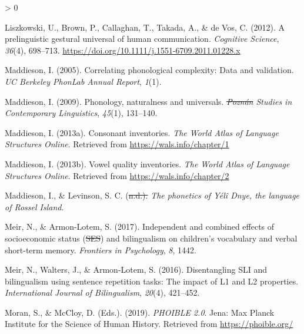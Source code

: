 \documentclass[ %
american, %
,man,floatsintext]{apa6} %
\newlength{\cslhangindent} %
\newenvironment{CSLReferences}[2] %
{%
	\setlength{\parindent}{0pt} %
	\ifodd #1 \everypar{\setlength{\hangindent}{\cslhangindent}}\ignorespaces\fi %
	\ifnum #2 > 0 %
	\setlength{\parskip}{#2\baselineskip} %
	\fi %
}%
{} %
\providecommand{\DIFaddtex}[1]{{\protect\color{blue}\uwave{#1}}} %
\providecommand{\DIFdeltex}[1]{{\protect\color{red}\sout{#1}}}                      %
\providecommand{\DIFaddbegin}{} %
\providecommand{\DIFaddend}{} %
\providecommand{\DIFdelbegin}{} %
\providecommand{\DIFdelend}{} %
\providecommand{\DIFadd}[1]{\texorpdfstring{\DIFaddtex{#1}}{#1}} %
\providecommand{\DIFdel}[1]{\texorpdfstring{\DIFdeltex{#1}}{}} %
\newcommand{\DIFscaledelfig}{0.5}
\newlength{\DIFdelgraphicswidth} %
\newlength{\DIFdelgraphicsheight} %
\newcommand{\DIFaddincludegraphics}[2][]{{\color{blue}\fbox{\DIFOincludegraphics[#1]{#2}}}} %
\newcommand{\DIFdelincludegraphics}[2][]{%
	\sbox{\DIFdelgraphicsbox}{\DIFOincludegraphics[#1]{#2}}%
	\settoboxwidth{\DIFdelgraphicswidth}{\DIFdelgraphicsbox} %
	\settoboxtotalheight{\DIFdelgraphicsheight}{\DIFdelgraphicsbox} %
	\scalebox{\DIFscaledelfig}{%
		\parbox[b]{\DIFdelgraphicswidth}{\usebox{\DIFdelgraphicsbox}\\[-\baselineskip] \rule{\DIFdelgraphicswidth}{0em}}\llap{\resizebox{\DIFdelgraphicswidth}{\DIFdelgraphicsheight}{%
				\setlength{\unitlength}{\DIFdelgraphicswidth}%
				\begin{picture}(1,1)%
				\thicklines\linethickness{2pt} %
				{\color[rgb]{1,0,0}\put(0,0){\framebox(1,1){}}}%
				{\color[rgb]{1,0,0}\put(0,0){\line( 1,1){1}}}%
				{\color[rgb]{1,0,0}\put(0,1){\line(1,-1){1}}}%
				\end{picture}%
			}\hspace*{3pt}}} %
} %
\DeclareRobustCommand{\DIFaddbegin}{\DIFOaddbegin \let\includegraphics\DIFaddincludegraphics} %
\DeclareRobustCommand{\DIFaddend}{\DIFOaddend \let\includegraphics\DIFOincludegraphics} %
\DeclareRobustCommand{\DIFdelbegin}{\DIFOdelbegin \let\includegraphics\DIFdelincludegraphics} %
\DeclareRobustCommand{\DIFdelend}{\DIFOaddend \let\includegraphics\DIFOincludegraphics} %
\begin{document}
\begin{CSLReferences}{1}{0}
	\leavevmode\hypertarget{ref-liszkowski2012prelinguistic}{}%
	Liszkowski, U., Brown, P., Callaghan, T., Takada, A., \& de Vos, C. (2012). A prelinguistic gestural universal of human communication. \emph{Cognitive Science}, \emph{36}(4), 698--713. \url{https://doi.org/10.1111/j.1551-6709.2011.01228.x}
	
	\leavevmode\hypertarget{ref-maddieson2005correlating}{}%
	Maddieson, I. (2005). Correlating phonological complexity: Data and validation. \emph{UC Berkeley PhonLab Annual Report}, \emph{1}(1).
	
	\leavevmode\hypertarget{ref-maddieson2009phonology}{}%
	Maddieson, I. (2009). Phonology, naturalness and universals. \emph{\DIFdelbegin \DIFdel{Poznán }\DIFdelend \DIFaddbegin \DIFadd{Pozn}{\DIFadd{á}}\DIFadd{n }\DIFaddend Studies in Contemporary Linguistics}, \emph{45}(1), 131--140.
	
	\leavevmode\hypertarget{ref-maddieson2013consonant}{}%
	Maddieson, I. (2013a). Consonant inventories. \emph{The World Atlas of Language Structures Online}. Retrieved from \url{https://wals.info/chapter/1}
	
	\leavevmode\hypertarget{ref-maddieson2013vowel}{}%
	Maddieson, I. (2013b). Vowel quality inventories. \emph{The World Atlas of Language Structures Online}. Retrieved from \url{https://wals.info/chapter/2}
	
	\leavevmode\hypertarget{ref-maddiesonIPphoneticsYD}{}%
	Maddieson, I., \& Levinson, S. C. (\DIFdelbegin \DIFdel{n.d.). }\DIFdelend \DIFaddbegin \DIFadd{in preparation). }\DIFaddend \emph{The phonetics of \DIFaddbegin {\DIFaddend Yélî Dnye\DIFaddbegin }\DIFaddend , the language of \DIFaddbegin {\DIFaddend Rossel Island\DIFaddbegin }\DIFaddend }.
	
	\leavevmode\hypertarget{ref-meir2017independent}{}%
	Meir, N., \& Armon-Lotem, S. (2017). Independent and combined effects of socioeconomic status (\DIFdelbegin \DIFdel{SES}\DIFdelend \DIFaddbegin {\DIFadd{SES}}\DIFaddend ) and bilingualism on children's vocabulary and verbal short-term memory. \emph{Frontiers in Psychology}, \emph{8}, 1442.
	
	\leavevmode\hypertarget{ref-meir2016disentangling}{}%
	Meir, N., Walters, J., \& Armon-Lotem, S. (2016). \DIFaddbegin {\DIFaddend Disentangling SLI and bilingualism using sentence repetition tasks: The impact of L1 and L2 properties\DIFaddbegin }\DIFaddend . \emph{International Journal of Bilingualism}, \emph{20}(4), 421--452.
	
	\leavevmode\hypertarget{ref-phoible}{}%
	Moran, S., \& McCloy, D. (Eds.). (2019). \emph{PHOIBLE 2.0}. Jena: Max Planck Institute for the Science of Human History. Retrieved from \url{https://phoible.org/}
	

\end{CSLReferences}
\end{document}
